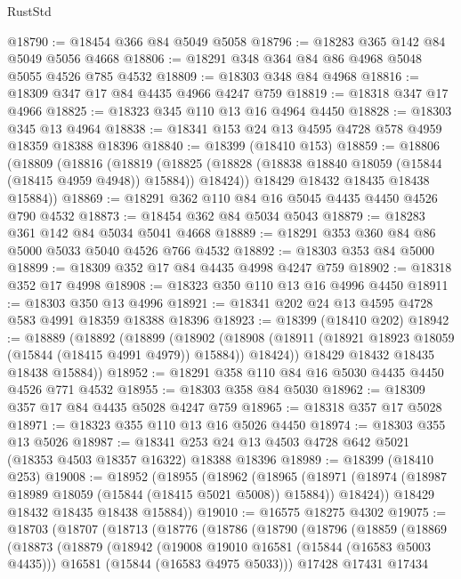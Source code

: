 \begin{lexlean}{RustStd}
\begin{coremodule}
@18790 := @18454 @366 @84 @5049 @5058
@18796 := @18283 @365 @142 @84 @5049 @5056 @4668
@18806 := @18291 @348 @364 @84 @86 @4968 @5048 @5055 @4526 @785 @4532
@18809 := @18303 @348 @84 @4968
@18816 := @18309 @347 @17 @84 @4435 @4966 @4247 @759
@18819 := @18318 @347 @17 @4966
@18825 := @18323 @345 @110 @13 @16 @4964 @4450
@18828 := @18303 @345 @13 @4964
@18838 := @18341 @153 @24 @13 @4595 @4728 @578 @4959 @18359 @18388 @18396
@18840 := @18399 (@18410 @153)
@18859 := @18806
    (@18809
      (@18816
        (@18819
          (@18825 (@18828 (@18838 @18840 @18059 (@15844 (@18415 @4959 @4948)) @15884)) @18424))
        @18429
        @18432
        @18435
        @18438
        @15884))
@18869 := @18291 @362 @110 @84 @16 @5045 @4435 @4450 @4526 @790 @4532
@18873 := @18454 @362 @84 @5034 @5043
@18879 := @18283 @361 @142 @84 @5034 @5041 @4668
@18889 := @18291 @353 @360 @84 @86 @5000 @5033 @5040 @4526 @766 @4532
@18892 := @18303 @353 @84 @5000
@18899 := @18309 @352 @17 @84 @4435 @4998 @4247 @759
@18902 := @18318 @352 @17 @4998
@18908 := @18323 @350 @110 @13 @16 @4996 @4450
@18911 := @18303 @350 @13 @4996
@18921 := @18341 @202 @24 @13 @4595 @4728 @583 @4991 @18359 @18388 @18396
@18923 := @18399 (@18410 @202)
@18942 := @18889
    (@18892
      (@18899
        (@18902
          (@18908 (@18911 (@18921 @18923 @18059 (@15844 (@18415 @4991 @4979)) @15884)) @18424))
        @18429
        @18432
        @18435
        @18438
        @15884))
@18952 := @18291 @358 @110 @84 @16 @5030 @4435 @4450 @4526 @771 @4532
@18955 := @18303 @358 @84 @5030
@18962 := @18309 @357 @17 @84 @4435 @5028 @4247 @759
@18965 := @18318 @357 @17 @5028
@18971 := @18323 @355 @110 @13 @16 @5026 @4450
@18974 := @18303 @355 @13 @5026
@18987 := @18341 @253 @24 @13 @4503 @4728 @642 @5021 (@18353 @4503 @18357 @16322) @18388 @18396
@18989 := @18399 (@18410 @253)
@19008 := @18952
    (@18955
      (@18962
        (@18965
          (@18971 (@18974 (@18987 @18989 @18059 (@15844 (@18415 @5021 @5008)) @15884)) @18424))
        @18429
        @18432
        @18435
        @18438
        @15884))
@19010 := @16575 @18275 @4302
@19075 := @18703
    (@18707
      (@18713
        (@18776
          (@18786
            (@18790
              (@18796
                (@18859
                  (@18869
                    (@18873
                      (@18879
                        (@18942
                          (@19008 @19010 @16581 (@15844 (@16583 @5003 @4435)))
                          @16581
                          (@15844 (@16583 @4975 @5033)))
                        @17428
                        @17431
                        @17434

\end{coremodule}
\end{lexlean}
